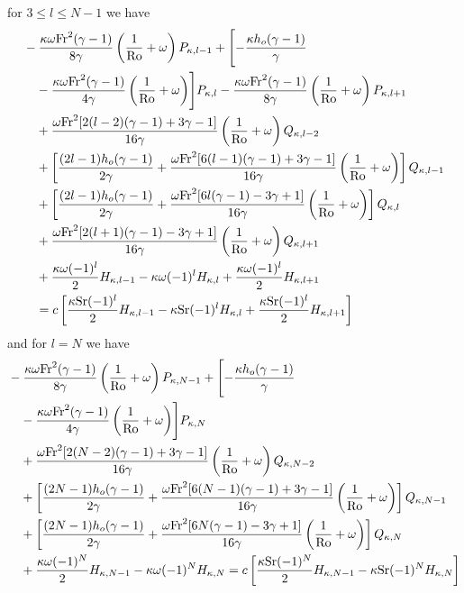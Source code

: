 for $3\le l\le N-1$ we have
\begin{align}
&-\frac{\kappa \omega \mathrm{Fr}^2(\gamma-1)}{8\gamma}\left( \frac{1}{\mathrm{Ro}}+\omega \right)P_{\kappa,l-1} + \Biggl[-\frac{\kappa h_o(\gamma-1)}{\gamma} \notag \\
&\quad-\frac{\kappa \omega \mathrm{Fr}^2(\gamma-1)}{4\gamma}\left( \frac{1}{\mathrm{Ro}}+\omega \right)\Biggr] P_{\kappa,l}-\frac{\kappa \omega \mathrm{Fr}^2(\gamma-1)}{8\gamma}\left( \frac{1}{\mathrm{Ro}}+\omega \right)P_{\kappa,l+1} \notag \\
&\quad+\frac{\omega \mathrm{Fr}^2[2(l-2)(\gamma-1)+3\gamma-1]}{16\gamma}\left( \frac{1}{\mathrm{Ro}}+\omega \right)Q_{\kappa,l-2} \notag\\
&\quad+ \left[\frac{(2l-1) h_o(\gamma-1)}{2\gamma} +\frac{\omega \mathrm{Fr}^2[6(l-1)(\gamma-1)+3\gamma-1]}{16\gamma}\left( \frac{1}{\mathrm{Ro}}+\omega \right)\right] Q_{\kappa,l-1} \notag \\
&\quad+\left[\frac{(2l-1) h_o(\gamma-1)}{2\gamma}+\frac{\omega \mathrm{Fr}^2[6l(\gamma-1)-3\gamma+1]}{16\gamma}\left( \frac{1}{\mathrm{Ro}}+\omega \right)\right] Q_{\kappa,l} \notag \\
&\quad+\frac{\omega \mathrm{Fr}^2[2(l+1)(\gamma-1)-3\gamma+1]}{16\gamma}\left( \frac{1}{\mathrm{Ro}}+\omega \right) Q_{\kappa,l+1} \notag \\
&\quad+\frac{\kappa \omega (-1)^l}{2}H_{\kappa,l-1}-\kappa \omega (-1)^l H_{\kappa,l}
+\frac{\kappa \omega (-1)^l}{2}H_{\kappa,l+1} \notag \\
&\quad=c\left[\frac{\kappa \mathrm{Sr}(-1)^l}{2} H_{\kappa,l-1}-\kappa \mathrm{Sr}(-1)^l H_{\kappa,l}+\frac{\kappa \mathrm{Sr}(-1)^l}{2} H_{\kappa,l+1} \right] \label{eq:commassl3p}
\end{align}
and for $l=N$ we have
\begin{align}
&-\frac{\kappa \omega \mathrm{Fr}^2(\gamma-1)}{8\gamma}\left( \frac{1}{\mathrm{Ro}}+\omega \right)P_{\kappa,N-1} + \Biggl[-\frac{\kappa h_o(\gamma-1)}{\gamma} \notag \\
&\quad-\frac{\kappa \omega \mathrm{Fr}^2(\gamma-1)}{4\gamma}\left( \frac{1}{\mathrm{Ro}}+\omega \right)\Biggr] P_{\kappa,N} \notag \\
&\quad+\frac{\omega \mathrm{Fr}^2[2(N-2)(\gamma-1)+3\gamma-1]}{16\gamma}\left( \frac{1}{\mathrm{Ro}}+\omega \right)Q_{\kappa,N-2} \notag\\
&\quad+ \left[\frac{(2N-1) h_o(\gamma-1)}{2\gamma} +\frac{\omega \mathrm{Fr}^2[6(N-1)(\gamma-1)+3\gamma-1]}{16\gamma}\left( \frac{1}{\mathrm{Ro}}+\omega \right)\right] Q_{\kappa,N-1} \notag \\
&\quad+\left[\frac{(2N-1) h_o(\gamma-1)}{2\gamma}+\frac{\omega \mathrm{Fr}^2[6N(\gamma-1)-3\gamma+1]}{16\gamma}\left( \frac{1}{\mathrm{Ro}}+\omega \right)\right] Q_{\kappa,N} \notag \\
&\quad+\frac{\kappa \omega (-1)^N}{2}H_{\kappa,N-1}-\kappa \omega (-1)^N H_{\kappa,N}
 =c\left[\frac{\kappa \mathrm{Sr}(-1)^N}{2} H_{\kappa,N-1}-\kappa \mathrm{Sr}(-1)^N H_{\kappa,N} \right] \label{eq:commasslN}
\end{align}

